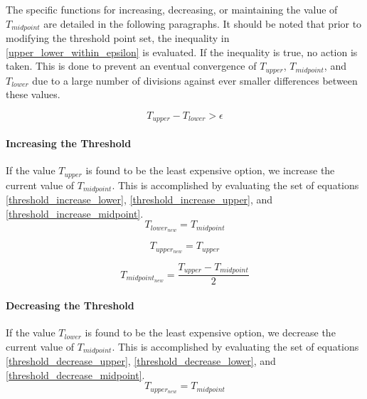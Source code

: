 The specific functions for increasing, decreasing, or maintaining the value of $T_{midpoint}$ are detailed in the following paragraphs.  It should be noted that prior to modifying the threshold point set, the inequality in \ref{upper_lower_within_epsilon} is evaluated.  If the inequality is true, no action is taken.  This is done to prevent an eventual convergence of $T_{upper}$, $T_{midpoint}$, and $T_{lower}$ due to a large number of divisions against ever smaller differences between these values.

\begin{equation}
T_{upper} - T_{lower} > \epsilon \label{upper_lower_within_epsilon}
\end{equation}

\paragraph{Increasing the Threshold}
If the value $T_{upper}$ is found to be the least expensive option, we increase the current value of $T_{midpoint}$.  This is accomplished by evaluating the set of equations \ref{threshold_increase_lower}, \ref{threshold_increase_upper}, and \ref{threshold_increase_midpoint}.
\begin{equation}
T_{lower_{new}} = T_{midpoint}\label{threshold_increase_lower}
\end{equation}

\begin{equation}
T_{upper_{new}} = T_{upper}\label{threshold_increase_upper}
\end{equation}

\begin{equation}
T_{midpoint_{new}} = \frac{T_{upper} - T_{midpoint}}{2} \label{threshold_increase_midpoint}
\end{equation}

\paragraph{Decreasing the Threshold}
If the value $T_{lower}$ is found to be the least expensive option, we decrease the current value of $T_{midpoint}$.  This is accomplished by evaluating the set of equations \ref{threshold_decrease_upper}, \ref{threshold_decrease_lower}, and \ref{threshold_decrease_midpoint}.
\begin{equation}
T_{upper_{new}} = T_{midpoint}\label{threshold_decrease_upper}
\end{equation}

